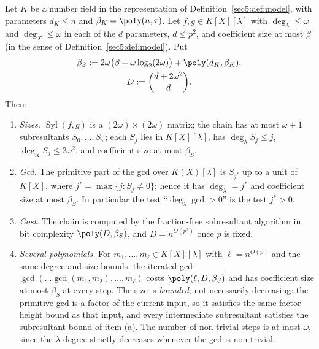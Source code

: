 \begin{lem}\label{sec5:sub:subres}\label{sec5:lem:subres}\label{sec5:lem:multigcd}
Let $K$ be a number field in the representation of Definition~\ref{sec5:def:model}, with parameters
$d_K\le n$ and $\beta_K=\poly(n,\tau)$. Let $f,g\in K[X][\lambda]$ with $\deg_\lambda\le\omega$ and
$\deg_X\le\omega$ in each of the $d$ parameters, $d\le p^{2}$, and coefficient size at most $\beta$ (in
the sense of Definition~\ref{sec5:def:model}). Put
\begin{equation}\label{sec5:eq:sizes}
\begin{gathered}
\beta_S:=2\omega\bigl(\beta+\omega\log_2(2\omega)\bigr)+\poly(d_K,\beta_K),\\
D:=\binom{d+2\omega^{2}}{d}.
\end{gathered}
\end{equation}
Then:
\begin{enumerate}[label=(\alph*),leftmargin=*]
\item \emph{Sizes.} $\operatorname{Syl}(f,g)$ is a $(2\omega)\times(2\omega)$ matrix; the chain has at
most $\omega+1$ subresultants $S_0,\dots,S_\omega$; each $S_j$ lies in $K[X][\lambda]$, has
$\deg_\lambda S_j\le j$, $\deg_X S_j\le 2\omega^{2}$, and coefficient size at most $\beta_S$.
\item \emph{Gcd.} The primitive part of the gcd over $K(X)[\lambda]$ is $S_{j^{*}}$ up to a unit of
$K[X]$, where $j^{*}=\max\{j:S_j\neq0\}$; hence it has $\deg_\lambda=j^{*}$ and coefficient size at
most $\beta_S$. In particular the test ``$\deg_\lambda\gcd>0$'' is the test $j^{*}>0$.
\item \emph{Cost.} The chain is computed by the fraction-free subresultant algorithm in bit complexity
$\poly(D,\beta_S)$, and $D=n^{O(p^{2})}$ once $p$ is fixed.
\item \emph{Several polynomials.} For $m_1,\dots,m_\ell\in K[X][\lambda]$ with $\ell=n^{O(p)}$ and the
same degree and size bounds, the iterated gcd $\gcd(\dots\gcd(m_1,m_2),\dots,m_\ell)$ costs
$\poly(\ell,D,\beta_S)$ and has coefficient size at most $\beta_S$ at every step. The size is
\emph{bounded}, not necessarily decreasing: the primitive gcd is a factor of the current input, so it
satisfies the same factor-height bound as that input, and every intermediate subresultant satisfies the
subresultant bound of item (a). The number of non-trivial steps is at most $\omega$, since the
$\lambda$-degree strictly decreases whenever the gcd is non-trivial.
\end{enumerate}
\end{lem}

